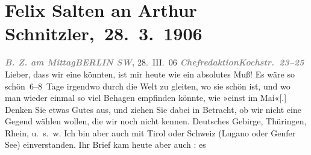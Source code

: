                \section[ Felix Salten an Arthur Schnitzler, 28. 3. 1906]{ Felix Salten an Arthur Schnitzler, 28. 3. 1906}\nopagebreak{}\rehead{ }\begin{ledgroupsized}[t]{13cm}\normalsize\beginnumbering \toendnotes[C]{\smallbreak\pagebreak[2]} 
\toendnotes[C]{\smallbreak}\pstart
           \noindent{}{\pb}\textcolor{gray}{\textbf{\emph{B. Z. am Mittag}}}\hfill \textcolor{gray}{\textbf{\emph{BERLIN SW},}}{ }28. III. 06\pend
           \pstart
           \textcolor{gray}{\textbf{\emph{Chefredaktion}}}\hfill \textcolor{gray}{\textbf{\emph{Kochstr. 23–25}}}\pend
           \pstart
           Lieber, dass wir eine \label{K_L03416-1v}\label{K_L03416-1h} könnten,
               ist mir heute wie ein absolutes Muß! Es wäre so schön 6–8 Tage irgendwo durch die
               Welt zu gleiten, wo sie schön ist, und wo man wieder einmal so viel Behagen empfinden
               könnte, wie »einst im Mai«{[}.{]} Denken Sie etwas Gutes aus, und
               ziehen Sie dabei in Betracht, ob wir nicht eine Gegend wählen wollen, die wir noch
               nicht kennen. Deutsches Gebirge, Thüringen, Rhein, u. s. w. Ich bin aber auch mit Tirol oder Schweiz (Lugano oder Genfer See) einverstanden. Ihr Brief kam heute aber auch \label{K_L03416-2v}\label{K_L03416-2h}: es

\end{ledgroupsized}
